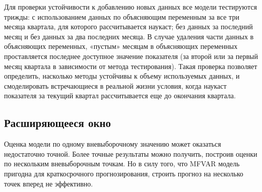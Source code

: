 \documentclass[a4paper, 14pt]{extreport}
\numberwithin{equation}{section}
\numberwithin{equation}{section}
\begin{document}
	Для проверки устойчивости к добавлению новых данных все модели тестируются трижды: с использованием данных по объясняющим переменным за все три месяца квартала, для которого рассчитывается наукаст; без данных за последний месяц и без данных за два последних месяца. В случае удаления части данных в объясняющих переменных, «пустым» месяцам в объясняющих переменных проставляется последнее доступное значение показателя (за второй или за первый месяц квартала в зависимости от метода тестирования). Такая проверка позволяет определить, насколько методы устойчивы к объему используемых данных, и смоделировать встречающиеся в реальной жизни условия, когда наукаст показателя за текущий квартал рассчитывается еще до окончания квартала. 
	
	\subsection{Расширяющееся окно}
	\label{subsec:exp-win}
	
	Оценка модели по одному вневыборочному значению может оказаться недостаточно точной. Более точные результаты можно получить, построив оценки по нескольким вневыборочным точкам. Но в силу того, что MFVAR модель пригодна для краткосрочного прогнозирования, строить прогноз на несколько точек вперед не эффективно.
	
\end{document}
